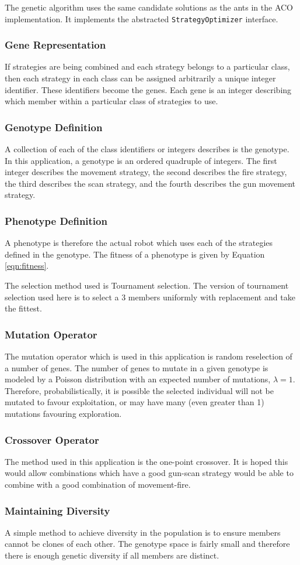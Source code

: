 The genetic algorithm uses the same candidate solutions as the ants in the ACO implementation. It implements the abstracted \texttt{StrategyOptimizer} interface.

\subsubsection{Gene Representation}
If strategies are being combined and each strategy belongs to a particular class, then each strategy in each class can be assigned arbitrarily a unique integer identifier. These identifiers become the genes. Each gene is an integer describing which member within a particular class of strategies to use.

\subsubsection{Genotype Definition}
A collection of each of the class identifiers or integers describes is the genotype. In this application, a genotype is an ordered quadruple of integers. The first integer describes the movement strategy, the second describes the fire strategy, the third describes the scan strategy, and the fourth describes the gun movement strategy.

\subsubsection{Phenotype Definition}
A phenotype is therefore the actual robot which uses each of the strategies defined in the genotype. The fitness of a phenotype is given by Equation \ref{eqn:fitness}.

The selection method used is Tournament selection. The version of tournament selection used here is to select a 3 members uniformly with replacement and take the fittest.

\subsubsection{Mutation Operator}
The mutation operator which is used in this application is random reselection of a number of genes. The number of genes to mutate in a given genotype is modeled by a Poisson distribution with an expected number of mutations, $\lambda = 1$. Therefore, probabilistically, it is possible the selected individual will not be mutated to favour exploitation, or may have many (even greater than 1)  mutations favouring exploration.

\subsubsection{Crossover Operator}
The method used in this application is the one-point crossover. It is hoped this would allow combinations which have a good gun-scan strategy would be able to combine with a good combination of movement-fire.

\subsubsection{Maintaining Diversity}
A simple method to achieve diversity in the population is to ensure members cannot be clones of each other. The genotype space is fairly small and therefore there is enough genetic diversity if all members are distinct.
